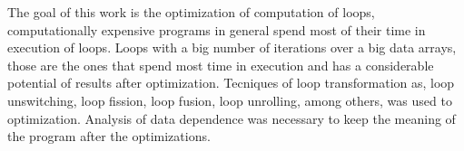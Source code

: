 \begin{Abstract}
        The goal of this work is the optimization of computation of loops,
        computationally expensive programs in general spend most of their time
        in execution of loops.
        Loops with a big number of iterations over a big data arrays, those are
        the ones that spend most time in execution and has a considerable
        potential of results after optimization.
        Tecniques of loop transformation as, loop unswitching, loop fission,
        loop fusion, loop unrolling, among others, was used to optimization.
        Analysis of data dependence was necessary to keep the meaning of the 
        program after the optimizations.
\end{Abstract}

